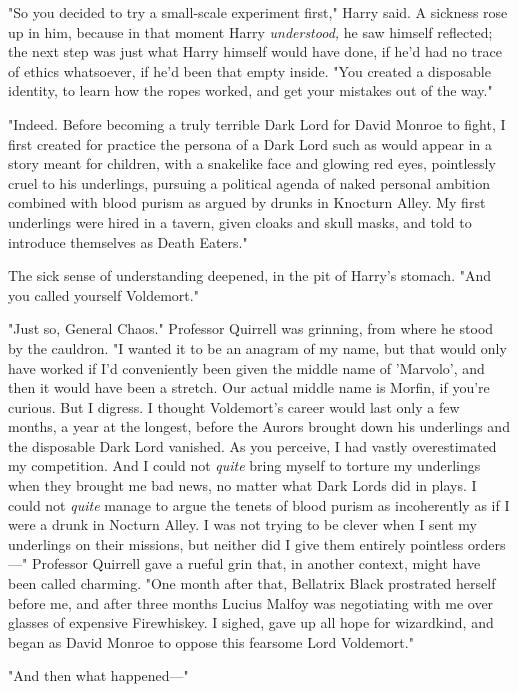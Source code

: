 "So you decided to try a small-scale experiment first," Harry said. A sickness 
rose up in him, because in that moment Harry \emph{understood,} he saw himself 
reflected; the next step was just what Harry himself would have done, if he'd 
had no trace of ethics whatsoever, if he'd been that empty inside. "You created 
a disposable identity, to learn how the ropes worked, and get your mistakes out 
of the way."

"Indeed. Before becoming a truly terrible Dark Lord for David Monroe to fight, 
I first created for practice the persona of a Dark Lord such as would appear in 
a story meant for children, with a snakelike face and glowing red eyes, 
pointlessly cruel to his underlings, pursuing a political agenda of naked 
personal ambition combined with blood purism as argued by drunks in Knocturn 
Alley. My first underlings were hired in a tavern, given cloaks and skull 
masks, and told to introduce themselves as Death Eaters."

The sick sense of understanding deepened, in the pit of Harry's stomach. "And 
you called yourself Voldemort."

"Just so, General Chaos." Professor Quirrell was grinning, from where he stood 
by the cauldron. "I wanted it to be an anagram of my name, but that would only 
have worked if I'd conveniently been given the middle name of 'Marvolo', and 
then it would have been a stretch. Our actual middle name is Morfin, if you're 
curious. But I digress. I thought Voldemort's career would last only a few 
months, a year at the longest, before the Aurors brought down his underlings 
and the disposable Dark Lord vanished. As you perceive, I had vastly 
overestimated my competition. And I could not \emph{quite} bring myself to 
torture my underlings when they brought me bad news, no matter what Dark Lords 
did in plays. I could not \emph{quite} manage to argue the tenets of blood 
purism as incoherently as if I were a drunk in Nocturn Alley. I was not trying 
to be clever when I sent my underlings on their missions, but neither did I 
give them entirely pointless orders---" Professor Quirrell gave a rueful grin 
that, in another context, might have been called charming. "One month after 
that, Bellatrix Black prostrated herself before me, and after three months 
Lucius Malfoy was negotiating with me over glasses of expensive Firewhiskey. I 
sighed, gave up all hope for wizardkind, and began as David Monroe to oppose 
this fearsome Lord Voldemort."

"And then what happened---"

